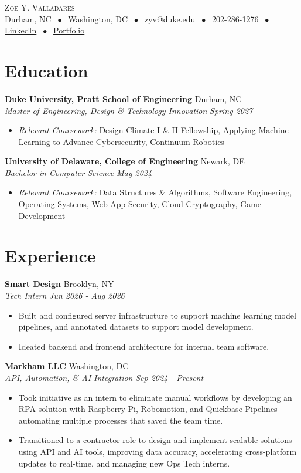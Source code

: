 \documentclass[letterpaper,10pt]{article}
\newcommand{\entry}[4]{%
  \vspace{2pt}
  \noindent\textbf{#1} \hfill #2 \\
  \noindent\textit{#3} \hfill \textit{#4}\par
  \vspace{-2pt}
}
\begin{document}
\begin{center}
  {\Huge \scshape Zoë Y. Valladares} \\
  Durham, NC $\;\bullet\;$ Washington, DC $\;\bullet\;$
  \href{mailto:zyv@duke.edu}{zyv@duke.edu} $\;\bullet\;$ 
  202-286-1276 $\;\bullet\;$ \href{https://www.linkedin.com/in/zoe-yoyo-valladares/}{LinkedIn} $\;\bullet\;$ \href{https://zoevalladares.com}{Portfolio}
\end{center}

\section{Education}

\entry{Duke University, Pratt School of Engineering}{Durham, NC}
      {Master of Engineering, Design \& Technology Innovation}{Spring 2027}
      \begin{itemize}
        \item[] \textit{Relevant Coursework:} Design Climate I \& II Fellowship, Applying Machine Learning to Advance Cybersecurity, Continuum Robotics
      \end{itemize}

\entry{University of Delaware, College of Engineering}{Newark, DE}
      {Bachelor in Computer Science}{May 2024}
      \begin{itemize}
        \item[] \textit{Relevant Coursework:} Data Structures \& Algorithms, Software Engineering, Operating Systems, Web App Security, Cloud Cryptography, Game Development
      \end{itemize}

\section{Experience}
\entry{Smart Design}{Brooklyn, NY}
      {Tech Intern}{Jun 2026 - Aug 2026}
      \begin{itemize}
        \item Built and configured server infrastructure to support machine learning model pipelines, and annotated datasets to support model development.
        \item Ideated backend and frontend architecture for internal team software.
      \end{itemize}

\entry{Markham LLC}{Washington, DC}
      {API, Automation, \& AI Integration}{Sep 2024 - Present}
      \begin{itemize}
        \item Took initiative as an intern to eliminate manual workflows by developing an RPA solution with Raspberry Pi, Robomotion, and Quickbase Pipelines --- automating multiple processes that saved the team time.
        \item Transitioned to a contractor role to design and implement scalable solutions using API and AI tools, improving data accuracy, accelerating cross-platform updates to real-time, and managing new Ops Tech interns.
      \end{itemize}
\end{document}
